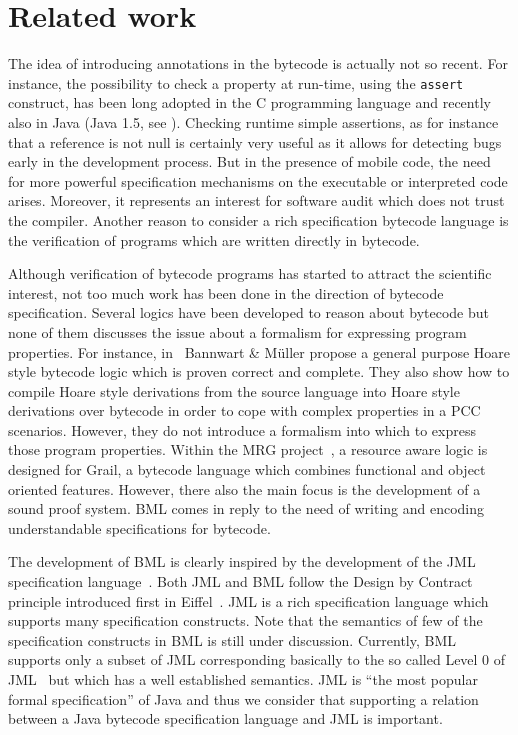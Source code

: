 

\section{Related work}\label{bml:relWork}

The idea of introducing annotations in the bytecode is actually not so recent.  
For instance, the possibility to check a property at run-time, using the \texttt{assert}
 construct, has been long adopted in the C programming language and recently also in Java (Java
1.5, see \cite[\S 14.10]{JLS}). Checking runtime simple assertions,
 as for instance that a reference is not  null is certainly very useful as it
 allows for detecting bugs early in the development process.    
But  in the presence of mobile code, the need for more
 powerful specification mechanisms on the executable or interpreted code arises. Moreover, it  represents an interest  
 for software audit which does not trust the compiler. Another reason to 
 consider a rich specification bytecode language  is the verification of programs which
 are written directly in bytecode. 

Although verification of bytecode programs has started to attract 
the scientific interest,  not too much work has been done in
the direction of bytecode specification. Several logics have been developed to reason about
bytecode but none of them discusses the issue about a formalism for expressing program properties.
For instance, in~\cite{BannwartMueller05} Bannwart \& M\"uller propose a general purpose Hoare style bytecode logic
 which is proven correct and complete. They also show how to compile Hoare style derivations 
from the source language into Hoare style derivations over bytecode in order to cope with complex properties in a PCC scenarios.
 However, they do not introduce a formalism into which to
 express those program properties. Within the MRG project~\cite{AspinallEtAl:TPHOLs2004}, a resource aware logic is designed for Grail, a bytecode
language which combines functional and object oriented features.  However, there also the main focus is the development of a sound proof system.
 BML comes in reply to the need of  writing  and encoding understandable specifications for
bytecode.

The development of BML is clearly inspired by the development of the
JML specification language~\cite{JMLRefMan}. Both JML and
BML follow the Design by Contract principle introduced first in
Eiffel~\cite{Meyer97}. JML is a rich specification language which supports many specification constructs. Note that the semantics of 
 few of the specification  constructs in BML is still under discussion. Currently, BML supports only a subset of JML  corresponding
basically to the so called Level 0 of JML~\cite{JMLRefMan} but  which has a well established semantics.
JML is ``the most popular formal specification'' of Java and thus 
we consider that supporting a relation between a Java bytecode specification language and JML is important.  

